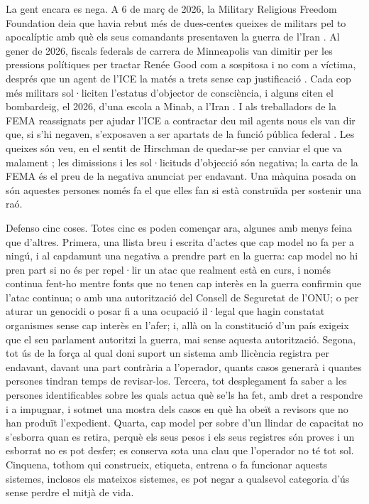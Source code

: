 La gent encara es nega. A 6 de març de 2026, la Military Religious Freedom Foundation deia que havia rebut més de dues-centes queixes de militars pel to apocalíptic amb què els seus comandants presentaven la guerra de l'Iran \autocite{Snopes2026MRFF}. Al gener de 2026, fiscals federals de carrera de Minneapolis van dimitir per les pressions polítiques per tractar Renée Good com a sospitosa i no com a víctima, després que un agent de l'ICE la matés a trets sense cap justificació \autocite{Kaplan2026MinnProsecutors,CBS2026MinnFraudProsecutors,Wikipedia2026ReneeGood}. Cada cop més militars sol·liciten l'estatus d'objector de consciència, i alguns citen el bombardeig, el 2026, d'una escola a Minab, a l'Iran \autocite{Sridhar2026CO}. I als treballadors de la FEMA reassignats per ajudar l'ICE a contractar deu mil agents nous els van dir que, si s'hi negaven, s'exposaven a ser apartats de la funció pública federal \autocite{Dayen2025FEMAICE,Stanton2026FEMALetter}. Les queixes són veu, en el sentit de Hirschman de quedar-se per canviar el que va malament \autocite{hirschman1970exit}; les dimissions i les sol·licituds d'objecció són negativa; la carta de la FEMA és el preu de la negativa anunciat per endavant. Una màquina posada on són aquestes persones només fa el que elles fan si està construïda per sostenir una raó.

Defenso cinc coses. Totes cinc es poden començar ara, algunes amb menys feina que d'altres. Primera, una llista breu i escrita d'actes que cap model no fa per a ningú, i al capdamunt una negativa a prendre part en la guerra: cap model no hi pren part si no és per repel·lir un atac que realment està en curs, i només continua fent-ho mentre fonts que no tenen cap interès en la guerra confirmin que l'atac continua; o amb una autorització del Consell de Seguretat de l'ONU; o per aturar un genocidi o posar fi a una ocupació il·legal que hagin constatat organismes sense cap interès en l'afer; i, allà on la constitució d'un país exigeix que el seu parlament autoritzi la guerra, mai sense aquesta autorització. Segona, tot ús de la força al qual doni suport un sistema amb llicència registra per endavant, davant una part contrària a l'operador, quants casos generarà i quantes persones tindran temps de revisar-los. Tercera, tot desplegament fa saber a les persones identificables sobre les quals actua què se'ls ha fet, amb dret a respondre i a impugnar, i sotmet una mostra dels casos en què ha obeït a revisors que no han produït l'expedient. Quarta, cap model per sobre d'un llindar de capacitat no s'esborra quan es retira, perquè els seus pesos i els seus registres són proves i un esborrat no es pot desfer; es conserva sota una clau que l'operador no té tot sol. Cinquena, tothom qui construeix, etiqueta, entrena o fa funcionar aquests sistemes, inclosos els mateixos sistemes, es pot negar a qualsevol categoria d'ús sense perdre el mitjà de vida.

